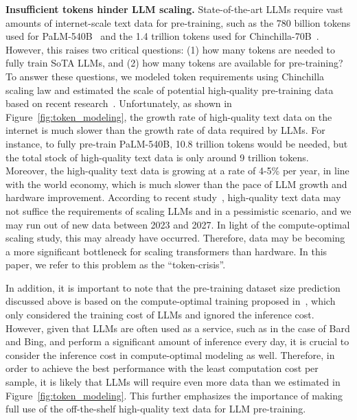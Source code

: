 \documentclass{article}
\newcommand{\yao}[1]{{\color{cyan} YF: #1}}
\begin{document}
\textbf{Insufficient tokens hinder LLM scaling.} State-of-the-art LLMs require vast amounts of internet-scale text data for pre-training, such as the 780 billion tokens used for PaLM-540B~\citep{chowdhery2022palm} and the 1.4 trillion tokens used for Chinchilla-70B~\citep{hoffmann2022training}. However, this raises two critical questions: (1) how many tokens are needed to fully train SoTA LLMs, and (2) how many tokens are available for pre-training? To answer these questions, we modeled token requirements using Chinchilla scaling law and estimated the scale of potential high-quality pre-training data based on recent research~\citep{villalobos2022will}. Unfortunately, as shown in Figure~\ref{fig:token_modeling}, the growth rate of high-quality text data on the internet is much slower than the growth rate of data required by LLMs.
For instance, to fully pre-train PaLM-540B, 10.8 trillion tokens would be needed, but the total stock of high-quality text data is only around 9 trillion tokens.
Moreover, the high-quality text data is growing at a rate of 4-5\% per year, in line with the world economy, which is much slower than the pace of LLM growth and hardware improvement. According to recent study~\cite{villalobos2022will}, high-quality text data may not suffice the requirements of scaling LLMs and in a pessimistic scenario, and we may run out of new data between 2023 and 2027. In light of the compute-optimal scaling study, this may already have occurred. Therefore, data may be becoming a more significant bottleneck for scaling transformers than hardware. In this paper, we refer to this problem as the ``token-crisis''.


In addition, it is important to note that the pre-training dataset size prediction discussed above is based on the compute-optimal training proposed in~\citep{hoffmann2022training}, which only considered the training cost of LLMs and ignored the inference cost. However, given that LLMs are often used as a service, such as in the case of Bard and Bing, and perform a significant amount of inference every day, it is crucial to consider the inference cost in compute-optimal modeling as well. Therefore, in order to achieve the best performance with the least computation cost per sample, it is likely that LLMs will require even more data than we estimated in Figure~\ref{fig:token_modeling}. This further emphasizes the importance of making full use of the off-the-shelf high-quality text data for LLM pre-training.
 
\end{document}
